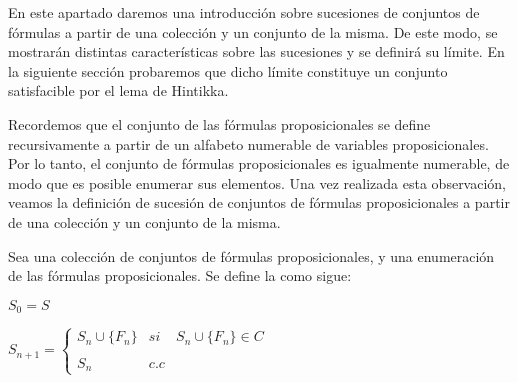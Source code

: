 %
\begin{isabellebody}%
%
%
\isadelimtheory
%
\endisadelimtheory
%
\isatagtheory
%
\endisatagtheory
{\isafoldtheory}%
%
\isadelimtheory
%
\endisadelimtheory
%
\begin{isamarkuptext}%
%
\end{isamarkuptext}\isamarkuptrue%
%
\begin{isamarkuptext}%
%
\end{isamarkuptext}\isamarkuptrue%
%
\begin{isamarkuptext}%
%
\end{isamarkuptext}\isamarkuptrue%
%
\isadelimdocument
%
\endisadelimdocument
%
\isatagdocument
%
\isamarkuptrue%
%
\endisatagdocument
{\isafolddocument}%
%
\isadelimdocument
%
\endisadelimdocument
%
\begin{isamarkuptext}%
En este apartado daremos una introducción sobre sucesiones de conjuntos de fórmulas a 
  partir de una colección y un conjunto de la misma. De este modo, se mostrarán distintas 
  características sobre las sucesiones y se definirá su límite. En la siguiente sección 
  probaremos que dicho límite constituye un conjunto satisfacible por el lema de Hintikka.


  Recordemos que el conjunto de las fórmulas proposicionales se define recursivamente a partir 
  de un alfabeto numerable de variables proposicionales. Por lo tanto, el conjunto de fórmulas 
  proposicionales es igualmente numerable, de modo que es posible enumerar sus elementos. Una vez 
  realizada esta observación, veamos la definición de sucesión de conjuntos de fórmulas 
  proposicionales a partir de una colección y un conjunto de la misma.

\begin{definicion}
  Sea  una colección de conjuntos de fórmulas proposicionales,  y  una 
  enumeración de las fórmulas proposicionales. Se define la  como sigue:

  $S_{0} = S$

  $S_{n+1} = \left\{ \begin{array}{lcc} S_{n} \cup \{F_{n}\} &  si  & S_{n} \cup \{F_{n}\} \in C \\ \\ S_{n} & c.c \end{array} \right.$ 
\end{definicion}


\end{isamarkuptext}
\end{isabellebody}
